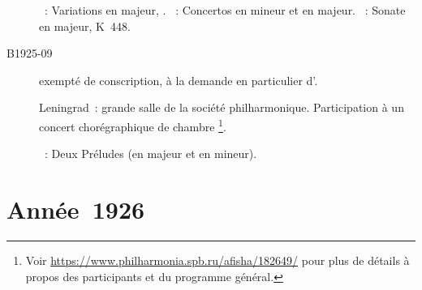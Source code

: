 \begin{description}
 \textsc{\Schumann{}}~: Variations en \kB \Flat majeur, .
 \textsc{\JBach{}}~: Concertos en \kC mineur et en \kC majeur.
 \textsc{\Mozart{}}~: Sonate en \kD majeur, K~448.
 \item[B1925-09]
 \VSofronitsky{} exempté de conscription, à la demande en particulier
 d'\AGlazounov{}.
 \item[\DateWithWeekDay{1925-11-22}]
 Leningrad~: grande salle de la société philharmonique.
 Participation à un concert chorégraphique de chambre%
 \footnote{Voir \href{https://www.philharmonia.spb.ru/afisha/182649/}%
 {https://www.philharmonia.spb.ru/afisha/182649/} pour plus de détails à
 propos des participants et du programme général.}.

 \textsc{\Rachmaninov{}}~: Deux Préludes (en \kG majeur et en \kG mineur).
\end{description}

\section{Année~1926}

